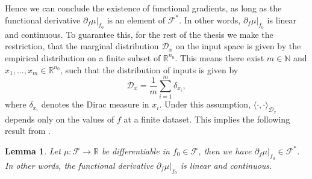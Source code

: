 \documentclass[11pt, a4paper]{article}
\newtheorem{lemma}[theorem]{Lemma}
\newcommand{\N}{\mathbb{N}}
\newcommand{\R}{\mathbb{R}}
\newcommand{\D}{\mathcal{D}}
\newcommand{\F}{\mathcal{F}}
\begin{document}
Hence we can conclude the existence of functional gradients, as long as the functional derivative $\partial_f \mu |_{f_0}$ is an element of $\F^*$. In other words, $\partial_f \mu |_{f_0}$ is linear and continuous. To guarantee this, for the rest of the thesis we make the restriction, that the marginal distribution $\D_x$ on the input space is given by the empirical distribution on a finite subset of $\R^{n_0}$. This means there exist $m \in \N$ and $x_1, \dots, x_m \in \R^{n_0}$, such that the distribution of inputs is given by
\[ \D_x = \frac{1}{m} \sum_{i=1}^{m} \delta_{x_i}, \]
where $\delta_{x_i}$ denotes the Dirac measure in $x_i$. Under this assumption, $\langle \cdot, \cdot \rangle_{\D_x}$ depends only on the values of $f$ at a finite dataset. This implies the following result from \cite{NTK}.

\begin{lemma} \label{lem:funcDerivative}
Let $\mu: \F \to \R$ be differentiable in $f_0 \in \F$, then we have $\partial_f\mu |_{f_0} \in \F^*$. In other words, the functional derivative $\partial_f\mu |_{f_0}$ is linear and continuous.
\end{lemma}
\end{document}
